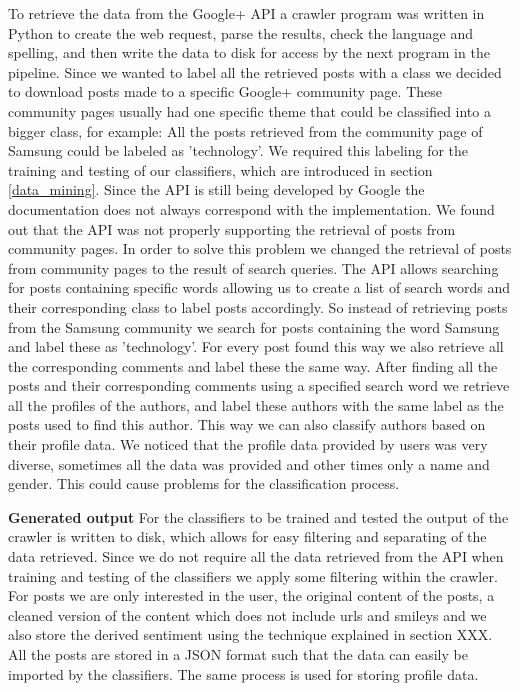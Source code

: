 To retrieve the data from the Google+ API a crawler program was written in Python to create the web request, parse the results, check the language and spelling, and then write the data to disk for access by the next program in the pipeline. Since we wanted to label all the retrieved posts with a class we decided to download posts made to a specific Google+ community page. These community pages usually had one specific theme that could be classified into a bigger class, for example: All the posts retrieved from the community page of Samsung could be labeled as 'technology'. We required this labeling for the training and testing of our classifiers, which are introduced in section \ref{data_mining}.
Since the API is still being developed by Google the documentation does not always correspond with the implementation. We found out that the API was not properly supporting the retrieval of posts from community pages. In order to solve this problem we changed the retrieval of posts from community pages to the result of search queries. The API allows searching for posts containing specific words allowing us to create a list of search words and their corresponding class to label posts accordingly. So instead of retrieving posts from the Samsung community we search for posts containing the word Samsung and label these as 'technology'.
For every post found this way we also retrieve all the corresponding comments and label these the same way. After finding all the posts and their corresponding comments using a specified search word we retrieve all the profiles of the authors, and label these authors with the same label as the posts used to find this author. This way we can also classify authors based on their profile data. We noticed that the profile data provided by users was very diverse, sometimes all the data was provided and other times only a name and gender. This could cause problems for the classification process.

\textbf{Generated output}
For the classifiers to be trained and tested the output of the crawler is written to disk, which allows for easy filtering and separating of the data retrieved. Since we do not require all the data retrieved from the API when training and testing of the classifiers we apply some filtering within the crawler. For posts we are only interested in the user, the original content of the posts, a cleaned version of the content which does not include urls and smileys and we also store the derived sentiment using the technique explained in section XXX. All the posts are stored in a JSON format such that the data can easily be imported by the classifiers. The same process is used for storing profile data.

